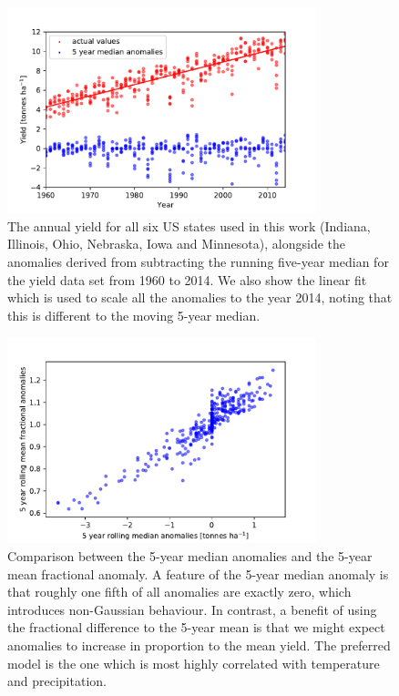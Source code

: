 \documentclass[12pt]{iopart}
\begin{document}
\begin{figure}
\centering
\includegraphics[width=0.8\textwidth]{./figures/yields_vs_mean_anoms}
\caption{\label{fig:yield_anomalies} The annual yield for all six US states used in this work (Indiana, Illinois, Ohio, Nebraska, Iowa and Minnesota), alongside the anomalies derived from subtracting the running five-year median for the yield data set from 1960 to 2014. We also show the linear fit which is used to scale all the anomalies to the year 2014, noting that this is different to the moving 5-year median.}
\end{figure}

\begin{figure}
\centering
\includegraphics[width=0.8\textwidth]{./figures/median_vs_frac_anoms_noline}
\caption{\label{fig:median_vs_frac_anoms_noline} Comparison between the 5-year median anomalies and the 5-year mean fractional anomaly. A feature of the 5-year median anomaly is that roughly one fifth of all anomalies are exactly zero, which introduces non-Gaussian behaviour. In contrast, a benefit of using the fractional difference to the 5-year mean is that we might expect anomalies to increase in proportion to the mean yield. The preferred model is the one which is most highly correlated with temperature and precipitation.
}
\end{figure}
\end{document}
